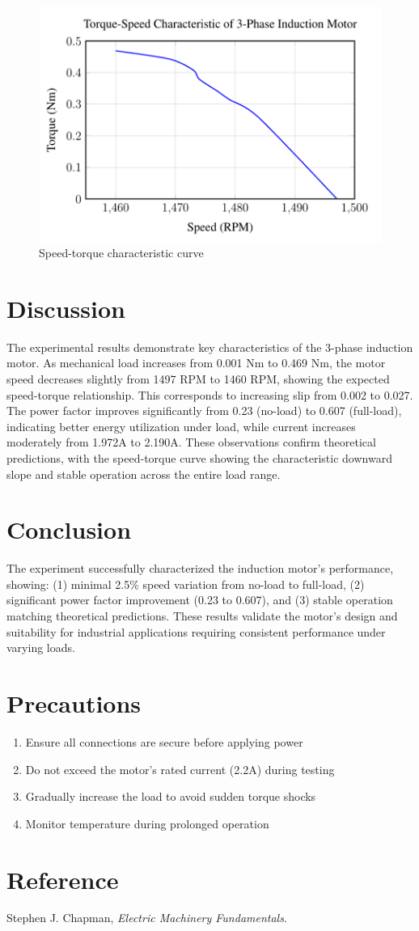 \documentclass[a4paper,12pt]{article}
\begin{document}
	
	\begin{figure}[H]
		\centering
	\includegraphics[width=0.68\linewidth]{Images/4}
		\caption{Speed-torque characteristic curve }
		\label{fig:results}
	\end{figure}
	
\section{Discussion}
The experimental results demonstrate key characteristics of the 3-phase induction motor. As mechanical load increases from 0.001 Nm to 0.469 Nm, the motor speed decreases slightly from 1497 RPM to 1460 RPM, showing the expected speed-torque relationship. This corresponds to increasing slip from 0.002 to 0.027. The power factor improves significantly from 0.23 (no-load) to 0.607 (full-load), indicating better energy utilization under load, while current increases moderately from 1.972A to 2.190A. These observations confirm theoretical predictions, with the speed-torque curve showing the characteristic downward slope and stable operation across the entire load range.

\section{Conclusion}
The experiment successfully characterized the induction motor's performance, showing: (1) minimal 2.5\% speed variation from no-load to full-load, (2) significant power factor improvement (0.23 to 0.607), and (3) stable operation matching theoretical predictions. These results validate the motor's design and suitability for industrial applications requiring consistent performance under varying loads.
	
	\section{Precautions}
	\begin{enumerate}
		\item Ensure all connections are secure before applying power
		\item Do not exceed the motor's rated current (2.2A) during testing
		\item Gradually increase the load to avoid sudden torque shocks
		\item Monitor temperature during prolonged operation
	\end{enumerate}
	
	\section{Reference}
	Stephen J. Chapman, \textit{Electric Machinery Fundamentals}.
\end{document}
